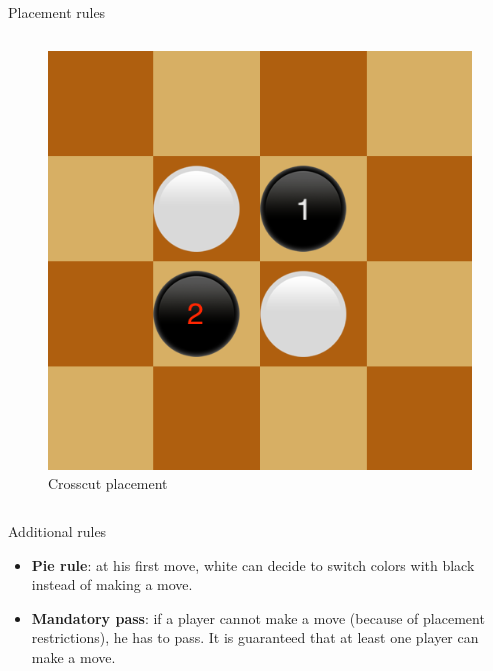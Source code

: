 \documentclass{beamer}
\begin{document}
\begin{frame}{Placement rules}
\begin{columns}
			\begin{figure}
				\includegraphics[scale=0.35]{images/crosscut.png}
				\caption*{Crosscut placement}
			\end{figure}
		
	\end{columns}
      \end{frame}
      
      \begin{frame}{Additional rules}
     \begin{itemize}
     \item \textbf{Pie rule}: at his first move, white can decide to switch colors with black instead of making a move.
     \item \textbf{Mandatory pass}: if a player cannot make a move (because of placement restrictions), he has to pass. It is guaranteed that at least one player can make a move.
     \end{itemize}
      \end{frame}
      
      
\end{document}
